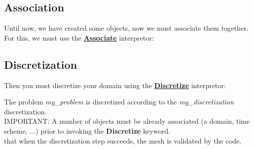 \subsection{Association}
Until now, we have created some objects, now we must associate them together.
For this, we must use the \href{\REFERENCEMANUAL\#associate}{\textbf{Associate}} interpretor:
    \begin{center}
    \end{center}




\subsection{Discretization}
Then you must discretize your domain using the \href{\REFERENCEMANUAL\#discretize}{\textbf{Discretize}} interpretor:
    \begin{center}
    \end{center}

The problem \textit{my\_problem} is discretized according to the \textit{my\_discretization} discretization.\\

IMPORTANT: A number of objects must be already associated (a domain, time scheme, ...) prior to invoking the \textbf{Discretize} keyword.\\

\Note that when the discretization step succeeds, the mesh is validated by the code.\\

